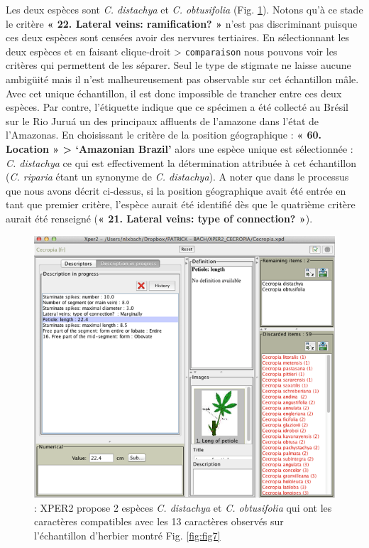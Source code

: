 \documentclass[a4paper]{article}
\theoremstyle{definition}
\theoremstyle{definition}
\theoremstyle{definition}
\theoremstyle{remark}
\begin{document}
Les deux espèces sont \emph{C. distachya} et \emph{C. obtusifolia} (Fig.
\ref{fig:fig8}). Notons qu'à ce stade le critère \textbf{« 22. Lateral
veins: ramification? »} n'est pas discriminant puisque ces deux espèces
sont censées avoir des nervures tertiaires. En sélectionnant les deux
espèces et en faisant clique-droit \textgreater{} \texttt{comparaison}
nous pouvons voir les critères qui permettent de les séparer. Seul le
type de stigmate ne laisse aucune ambigüité mais il n'est
malheureusement pas observable sur cet échantillon mâle. Avec cet unique
échantillon, il est donc impossible de trancher entre ces deux espèces.
Par contre, l'étiquette indique que ce spécimen a été collecté au Brésil
sur le Rio Juruá un des principaux affluents de l'amazone dans l'état de
l'Amazonas. En choisissant le critère de la position géographique :
\textbf{« 60. Location » \textgreater{} `Amazonian Brazil'} alors une
espèce unique est sélectionnée : \emph{C. distachya} ce qui est
effectivement la détermination attribuée à cet échantillon (\emph{C.
riparia} étant un synonyme de \emph{C. distachya}). A noter que dans le
processus que nous avons décrit ci-dessus, si la position géographique
avait été entrée en tant que premier critère, l'espèce aurait été
identifié dès que le quatrième critère aurait été renseigné (\textbf{«
21. Lateral veins: type of connection? »}).





\begin{figure}[H]

{\centering \includegraphics[width=1\linewidth]{figure/fig8} 

}

\caption{: XPER2 propose 2 espèces \emph{C. distachya} et \emph{C.
obtusifolia} qui ont les caractères compatibles avec les 13 caractères
observés sur l'échantillon d'herbier montré Fig. \ref{fig:fig7}}\label{fig:fig8}
\end{figure}
\end{document}
